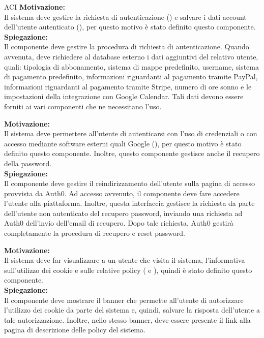 \begin{listaPersonale}{ACI}
    \textbf{Motivazione:}\\
    Il sistema deve gestire la richiesta di autenticazione () e salvare i dati account dell'utente autenticato (), per questo motivo è stato definito questo componente.\\
    \textbf{Spiegazione:}\\
    Il componente deve gestire la procedura di richiesta di autenticazione. Quando avvenuta, deve richiedere al database esterno i dati aggiuntivi del relativo utente, quali: tipologia di abbonamento, sistema di mappe predefinito, username, sistema di pagamento predefinito, informazioni riguardanti al pagamento tramite PayPal, informazioni riguardanti al pagamento tramite Stripe, numero di ore sonno e le impostazioni della integrazione con Google Calendar. Tali dati devono essere forniti ai vari componenti che ne necessitano l'uso.


    \textbf{Motivazione:}\\
    Il sistema deve permettere all'utente di autenticarsi con l'uso di credenziali o con accesso mediante software esterni quali Google (), per questo motivo è stato definito questo componente. Inoltre, questo componente gestisce anche il recupero della password.\\
    \textbf{Spiegazione:}\\
    Il componente deve gestire il reindirizzamento dell'utente sulla pagina di accesso provvista da Auth0. Ad accesso avvenuto, il componente deve fare accedere l'utente alla piattaforma. Inoltre, questa interfaccia gestisce la richiesta da parte dell'utente non autenticato del recupero password, inviando una richiesta ad Auth0 dell'invio dell'email di recupero. Dopo tale richiesta, Auth0 gestirà completamente la procedura di recupero e reset password.


    \textbf{Motivazione:}\\
    Il sistema deve far visualizzare a un utente che visita il sistema, l'informativa sull'utilizzo dei cookie e sulle relative policy ( e ), quindi è stato definito questo componente.\\
    \textbf{Spiegazione:}\\
    Il componente deve mostrare il banner che permette all'utente di autorizzare l'utilizzo dei cookie da parte del sistema e, quindi, salvare la risposta dell'utente a tale autorizzazione. Inoltre, nello stesso banner, deve essere presente il link alla pagina di descrizione delle policy del sistema.


\end{listaPersonale}

